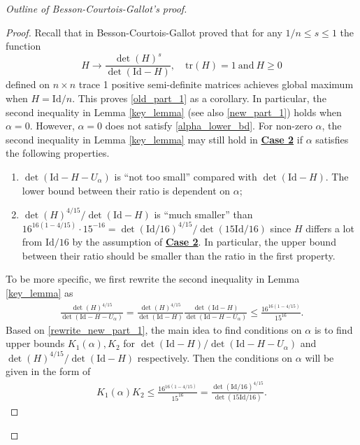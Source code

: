 \documentclass{article}
\newcommand{\id}{\mathrm{Id}}
\newcommand{\tr}{\mathrm{tr}}
\theoremstyle{definition}
\begin{document}
\begin{proof}[Outline of Besson-Courtois-Gallot's proof]
\begin{proof}
Recall that in \cite[B.4 Lemme]{BCG1} Besson-Courtois-Gallot proved that for any $1/n\leq s\leq 1$ the function 
$$H\to\frac{\det(H)^s}{\det(\id-H)},\quad \tr(H)=1\mathrm{~and~} H\geq 0$$
defined on $n\times n$ trace 1 positive semi-definite matrices achieves global maximum when $H=\id/n$. This proves \eqref{old_part_1} as a corollary. In particular, the second inequality in Lemma \ref{key_lemma} (see also  \eqref{new_part_1}) holds when $\alpha=0$. However, $\alpha=0$ does not satisfy \eqref{alpha_lower_bd}. For non-zero $\alpha$, the second inequality in Lemma \ref{key_lemma} may still hold in \textbf{\hyperlink{case2}{Case 2}} if $\alpha$ satisfies the following properties. 
\begin{enumerate}
\item[(1).] $\det(\id-H-U_\alpha)$ is ``not too small'' compared with $\det(\id-H)$. The lower bound between their ratio is dependent on $\alpha$;
\item[(2).] $\det(H)^{4/15}/\det(\id-H)$ is ``much smaller'' than $16^{16(1-4/15)}\cdot 15^{-16}=\det(\id/16)^{4/15}/\det(15\id/16)$ since $H$ differs a lot from $\id/16$ by the assumption of \textbf{\hyperlink{case2}{Case 2}}.  In particular, the upper bound between their ratio should be smaller than the ratio in the first property.
\end{enumerate}
To be more specific, we first rewrite the second inequality in Lemma \ref{key_lemma} as
\begin{align}\label{rewrite_new_part_1}\frac{\det(H)^{4/15}}{\det(\id-H-U_\alpha)}=\frac{\det(H)^{4/15}}{\det(\id-H)}\frac{\det(\id-H)}{\det(\id-H-U_\alpha)}\leq\frac{16^{16(1-4/15)}}{15^{16}}.
\end{align}
Based on \eqref{rewrite_new_part_1}, the main idea to find conditions on $\alpha$ is to find upper bounds $K_1(\alpha), K_2$ for $\det(\id-H)/\det(\id-H-U_\alpha)$ and $\det(H)^{4/15}/\det(\id-H)$ respectively. Then the conditions on $\alpha$ will be given in the form of \begin{align}\label{goal_of_step_3}K_1(\alpha)K_2\leq \frac{16^{16(1-4/15)}}{ 15^{16}}=\frac{\det(\id/16)^{4/15}}{\det(15\id/16)}.\end{align}


\end{proof}
\end{proof}
\end{document}
